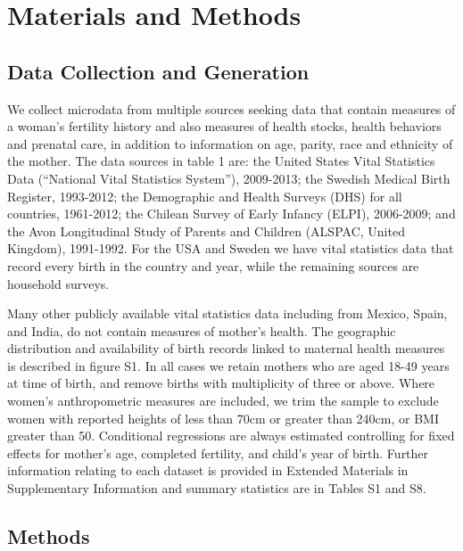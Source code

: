 \documentclass[11pt]{article}
\begin{document}
\section*{Materials and Methods}
\subsection*{Data Collection and Generation}
We collect microdata from multiple sources seeking data that contain measures of a woman's fertility history and also measures of health stocks, health behaviors and prenatal care, in addition to information on age, parity, race and ethnicity of the mother. The data sources in table 1 are: the United States Vital Statistics Data (``National Vital Statistics System''), 2009-2013; the Swedish Medical Birth Register, 1993-2012; the Demographic and Health Surveys (DHS) for all countries, 1961-2012; the Chilean Survey of Early Infancy (ELPI), 2006-2009; and the Avon Longitudinal Study of Parents and Children (ALSPAC, United Kingdom), 1991-1992. For the USA and Sweden we have vital statistics data that record every birth in the country and year, while the remaining sources are household surveys.

Many other publicly available vital statistics data including from Mexico, Spain, and India, do not contain  measures of mother's health.  The geographic distribution and availability of birth records linked to maternal health measures is described in figure S1. In all cases we retain mothers who are aged 18-49 years at time of birth, and remove births with multiplicity of three or above.  Where women's anthropometric measures are included, we trim the sample to exclude women with reported heights of less than 70cm or greater than 240cm, or BMI greater than 50.  Conditional regressions are always estimated controlling for fixed effects for mother's age, completed fertility, and child's year of birth. Further information relating to each dataset is provided in Extended Materials in Supplementary Information and summary statistics are in Tables S1 and S8.  

\subsection*{Methods}
\end{document}
